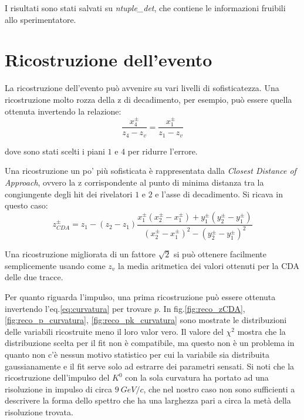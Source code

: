 \documentclass[8pt]{extarticle}
\begin{document}
I risultati sono stati salvati su \textit{ntuple\_det}, che contiene le informazioni fruibili allo sperimentatore.

\section{Ricostruzione dell'evento} \label{sec:reconstruction}

La ricostruzione dell'evento può avvenire su vari livelli di sofisticatezza. Una ricostruzione molto rozza della z di decadimento, per esempio, può essere quella ottenuta invertendo la relazione:
$$
\frac{x_4^{\pm}}{z_4-z_v} = \frac{x_1^{\pm}}{z_1-z_v}
$$

dove sono stati scelti i piani $1$ e $4$ per ridurre l'errore.

Una ricostruzione un po' più sofisticata è rappresentata dalla \textit{Closest Distance of Approach}, ovvero la z corrispondente al punto di minima distanza tra la congiungente degli hit dei rivelatori $1$ e $2$ e l'asse di decadimento. Si ricava in questo caso:
$$
z_{CDA}^{\pm} = z_1 - (z_2-z_1)\frac{x_1^{\pm}(x_2^{\pm}-x_1^{\pm}) + y_1^{\pm}(y_2^{\pm} - y_1^{\pm})}{(x_2^{\pm}-x_1^{\pm})^2-(y_2^{\pm}-y_1^{\pm})^2}
$$

Una ricostruzione migliorata di un fattore $\sqrt{2}$ si può ottenere facilmente semplicemente usando come $z_v$ la media aritmetica dei valori ottenuti per la CDA delle due tracce. \medskip

Per quanto riguarda l'impulso, una prima ricostruzione può essere ottenuta invertendo l'eq.\ref{eq:curvatura} per trovare $p$. In fig.\ref{fig:reco_zCDA},\ref{fig:reco_p_curvatura}, \ref{fig:reco_pk_curvatura} sono mostrate le distribuzioni delle variabili ricostruite meno il loro valor vero. Il valore del $\chi^2$ mostra che la distribuzione scelta per il fit non è compatibile, ma questo non è un problema in quanto non c'è nessun motivo statistico per cui la variabile sia distribuita gaussianamente e il fit serve solo ad estrarre dei parametri sensati. Si noti che la ricostruzione dell'impulso del $K^0$ con la sola curvatura ha portato ad una risoluzione in impulso di circa $9\ GeV/c$, che nel nostro caso non sono sufficienti a descrivere la forma dello spettro che ha una larghezza pari a circa la metà della risoluzione trovata.
\end{document}
